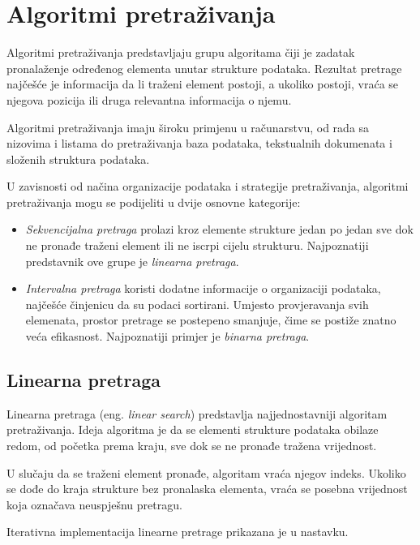 \section{Algoritmi pretraživanja}

Algoritmi pretraživanja predstavljaju grupu algoritama čiji je zadatak pronalaženje određenog elementa unutar strukture podataka. Rezultat pretrage najčešće je informacija da li traženi element postoji, a ukoliko postoji, vraća se njegova pozicija ili druga relevantna informacija o njemu.

Algoritmi pretraživanja imaju široku primjenu u računarstvu, od rada sa nizovima i listama do pretraživanja baza podataka, tekstualnih dokumenata i složenih struktura podataka.

U zavisnosti od načina organizacije podataka i strategije pretraživanja, algoritmi pretraživanja mogu se podijeliti u dvije osnovne kategorije:

\begin{itemize}
	\item \textit{Sekvencijalna pretraga} prolazi kroz elemente strukture jedan po jedan sve dok ne pronađe traženi element ili ne iscrpi cijelu strukturu. Najpoznatiji predstavnik ove grupe je \textit{linearna pretraga}.
	
	\item \textit{Intervalna pretraga} koristi dodatne informacije o organizaciji podataka, najčešće činjenicu da su podaci sortirani. Umjesto provjeravanja svih elemenata, prostor pretrage se postepeno smanjuje, čime se postiže znatno veća efikasnost. Najpoznatiji primjer je \textit{binarna pretraga}.

\end{itemize}

\subsection{Linearna pretraga}

Linearna pretraga (eng. \emph{linear search}) predstavlja najjednostavniji algoritam pretraživanja. Ideja algoritma je da se elementi strukture podataka obilaze redom, od početka prema kraju, sve dok se ne pronađe tražena vrijednost.

U slučaju da se traženi element pronađe, algoritam vraća njegov indeks. Ukoliko se dođe do kraja strukture bez pronalaska elementa, vraća se posebna vrijednost koja označava neuspješnu pretragu.

Iterativna implementacija linearne pretrage prikazana je u nastavku.

